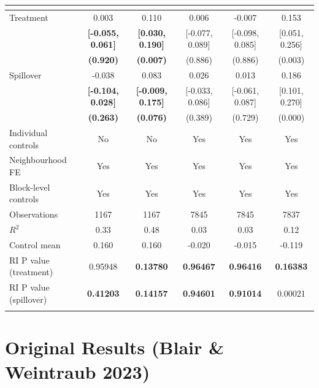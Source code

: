 \documentclass[11pt]{article}
\begin{document}
\begin{table}[htbp]
{\begin{tabular}{@{\extracolsep{4pt}}l*{5}{c}@{}}
                &&&&&\\
\hline
Treatment       &   0.003&   0.110&   0.006&  -0.007&   0.153\\
                &\textbf{[-0.055, 0.061]}&\textbf{[0.030, 0.190]}&[-0.077, 0.089]&[-0.098, 0.085]&[0.051, 0.256]\\
                &  \textbf{(0.920)}&  \textbf{(0.007)}&  (0.886)&  (0.886)&  (0.003)\\
Spillover       &  -0.038&   0.083&   0.026&   0.013&   0.186\\
                &\textbf{[-0.104, 0.028]}&\textbf{[-0.009, 0.175]}&[-0.033, 0.086]&[-0.061, 0.087]&[0.101, 0.270]\\
                &  \textbf{(0.263)}&  \textbf{(0.076)}&  (0.389)&  (0.729)&  (0.000)\\
Individual controls &       No&       No&      Yes&      Yes&      Yes\\
Neighbourhood FE &      Yes&      Yes&      Yes&      Yes&      Yes\\
Block-level controls &      Yes&      Yes&      Yes&      Yes&      Yes\\
Observations    &    1167&    1167&    7845&    7845&    7837\\
$R^2$           &    0.33&    0.48&    0.03&    0.03&    0.12\\
Control mean    &   0.160&   0.160&  -0.020&  -0.015&  -0.119\\
RI P value (treatment)&  0.95948&\textbf{  0.13780}&\textbf{  0.96467}&\textbf{  0.96416}&\textbf{  0.16383}\\
RI P value (spillover)&\textbf{  0.41203}&\textbf{  0.14157}&\textbf{  0.94601}&\textbf{  0.91014}&  0.00021\\
\noalign{\smallskip} \hline
\end{tabular}
}
\medskip

\end{table}

\section{Original Results (Blair \& Weintraub 2023)}
\end{document}
